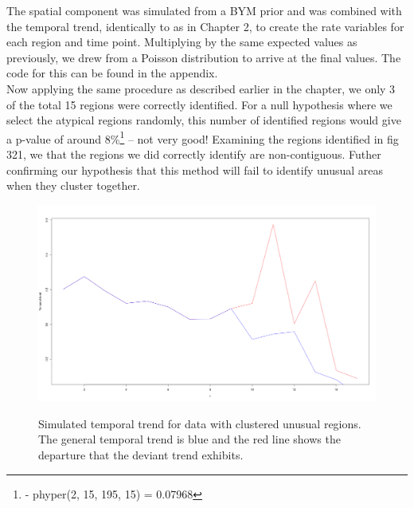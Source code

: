 \documentclass[11pt]{report}
\begin{document}
The spatial component was simulated from a BYM prior and was combined with the temporal trend, identically to as in Chapter 2, to create the rate variables for each region and time point. Multiplying by the same expected values as previously, we drew from a Poisson distribution to arrive at the final values. The code for this can be found in the appendix. \\

Now applying the same procedure as described earlier in the chapter, we only 3 of the total 15 regions were correctly identified. For a null hypothesis where we select the atypical regions randomly, this number of identified regions would give a p-value of around 8\%\footnote{ - phyper(2, 15, 195, 15) = 0.07968} -- not very good! Examining the regions identified in fig 321, we that the regions we did correctly identify are non-contiguous. Futher confirming our hypothesis that this method will fail to identify unusual areas when they cluster together.


\begin{figure}
\centering
\includegraphics[width=5in]{preftemporal}
\label{fig:preftemporal}
\caption{Simulated temporal trend for data with clustered unusual regions. The general temporal trend is blue and the red line shows the departure that the deviant trend exhibits.}
\end{figure}
\end{document}

